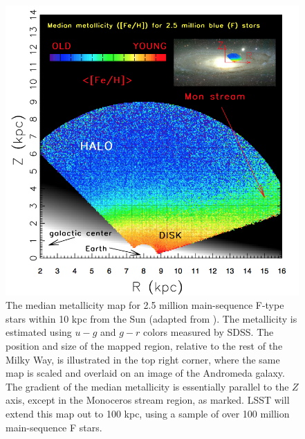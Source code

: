 \begin{figure}
\includegraphics[width=1.\hsize,clip]{panelsLSST.png}
\caption{
The median metallicity map for 2.5 million main-sequence F-type stars within 10 kpc
from the Sun (adapted from \cite{2008ApJ...684..287I}). The metallicity is estimated using
$u-g$ and $g-r$ colors measured by SDSS. The position and size of the mapped
region, relative to the rest of the Milky Way, is illustrated in the top right
corner, where the same map is scaled and overlaid on an image of the Andromeda
galaxy. The gradient of the median metallicity is essentially parallel
to the $Z$ axis, except in the Monoceros stream region, as marked. LSST
will extend this map out to 100 kpc, using a sample of over 100 million
main-sequence F stars.}
\label{Fig:FeH3}
\end{figure}


